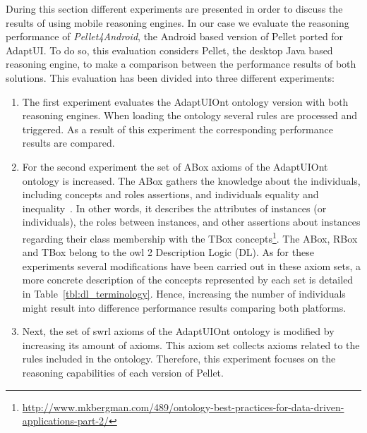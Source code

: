 During this section different experiments are presented in order to 
discuss the results of using mobile reasoning engines. In our case we evaluate 
the reasoning performance of \textit{Pellet4Android}, the Android based version 
of Pellet ported for AdaptUI. To do so, this evaluation considers Pellet, the 
desktop Java based reasoning engine, to make a comparison between the 
performance results of both solutions. This evaluation has been divided into 
three different experiments:

\begin{enumerate}
  \item The first experiment evaluates the AdaptUIOnt ontology version with both 
  reasoning engines. When loading the ontology several rules are processed and 
  triggered. As a result of this experiment the corresponding performance 
  results are compared.
  
  \item For the second experiment the set of ABox axioms of the AdaptUIOnt 
  ontology is increased. The ABox gathers the knowledge about the 
  individuals, including concepts and roles assertions, and individuals 
  equality and inequality~\citep{krotzsch_description_2012}. In other words, 
  it describes the attributes of instances (or individuals), the roles between 
  instances, and other assertions about instances regarding their class 
  membership with the TBox concepts\footnote{\url{http://www.mkbergman.com/489/ontology-best-practices-for-data-driven-applications-part-2/}}. The ABox, RBox and TBox 
  belong to the \ac{owl} 2 Description Logic (DL). As for these experiments several 
  modifications have been carried out in these axiom sets, a more concrete 
  description of the concepts represented by each set is detailed in 
  Table~\ref{tbl:dl_terminology}. Hence, increasing the number of individuals   
  might result into difference performance results comparing both platforms.
  
  \item Next, the set of \ac{swrl} axioms of the AdaptUIOnt ontology is modified 
  by increasing its amount of axioms. This axiom set collects axioms related to 
  the rules included in the ontology. Therefore, this experiment focuses on the 
  reasoning capabilities of each version of Pellet.
\end{enumerate}



